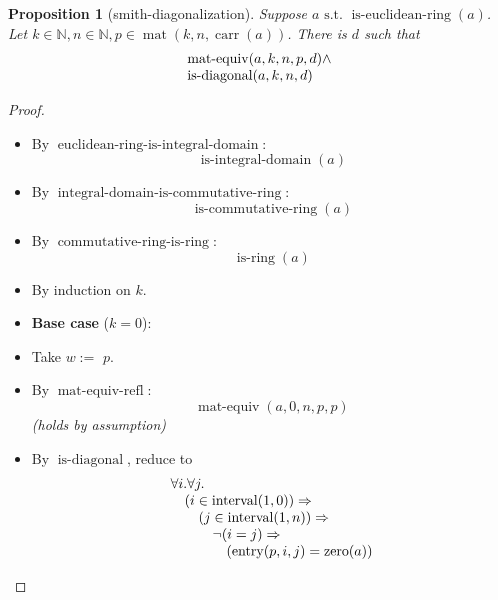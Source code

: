 \documentclass[11pt]{article}
\theoremstyle{plain}
\newtheorem{proposition}{Proposition}
\begin{document}
\begin{proposition}[smith-diagonalization]
Suppose $a \text{ s.t. } \operatorname{is\text{-}euclidean\text{-}ring}(a)$. Let $k \in \mathbb{N}, n \in \mathbb{N}, p \in \operatorname{mat}(k, n, \operatorname{carr}(a))$. There is $d$ such that 
\begin{equation*}
\begin{array}{@{}l@{}} \operatorname{mat\text{-}equiv}(a, k, n, p, d) \wedge \\ \operatorname{is\text{-}diagonal}(a, k, n, d) \end{array}
\end{equation*}

\end{proposition}

\begin{proof}
\begin{itemize}[leftmargin=2.8em, itemsep=4pt, parsep=1pt]
  \item[\textbf{3}] By $\operatorname{euclidean\text{-}ring\text{-}is\text{-}integral\text{-}domain}$:
\begin{equation*}
\operatorname{is\text{-}integral\text{-}domain}(a)
\end{equation*}

  \item[\textbf{4}] By $\operatorname{integral\text{-}domain\text{-}is\text{-}commutative\text{-}ring}$:
\begin{equation*}
\operatorname{is\text{-}commutative\text{-}ring}(a)
\end{equation*}

  \item[\textbf{5}] By $\operatorname{commutative\text{-}ring\text{-}is\text{-}ring}$:
\begin{equation*}
\operatorname{is\text{-}ring}(a)
\end{equation*}

  \item[\textbf{6}] By induction on $k$.
  \item[]\textbf{Base case} ($k = 0$):
  \item[\textbf{7--10}] Take $w :=$ $p$.
  \item[\textbf{11--13}] By $\operatorname{mat\text{-}equiv\text{-}refl}$:
\begin{equation*}
\operatorname{mat\text{-}equiv}(a, 0, n, p, p)
\end{equation*}
  \emph{(holds by assumption)}
  \item[\textbf{14}] By $\operatorname{is\text{-}diagonal}$, reduce to
\begin{equation*}
\begin{array}{@{}l@{}} \forall i. \forall j. \\ \quad (i \in \operatorname{interval}(1, 0)) \Rightarrow  \\ \quad \quad (j \in \operatorname{interval}(1, n)) \Rightarrow  \\ \quad \quad \quad \neg (i = j) \Rightarrow  \\ \quad \quad \quad \quad (\operatorname{entry}(p, i, j) = \operatorname{zero}(a)) \end{array}
\end{equation*}


\end{itemize}
\end{proof}
\end{document}
